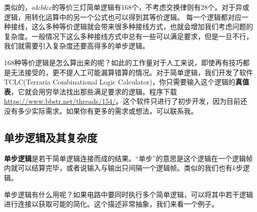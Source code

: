 类似的，$a\&b\&c$的等价三灯简单逻辑有168个，不考虑交换律则有28个。对于异或逻辑，用转化运算中的另一个公式也可以得到其等价逻辑。
每一个逻辑都对应一种接线，这么多种等价逻辑就会带来很多种接线方式，也就会增加我们考虑问题的复杂度。一般情况下这么多种接线方式中总有一些可以满足要求，但是一旦不行，我们就需要引入复杂度还要高得多的单步逻辑。

168种等价逻辑是怎么算出来的呢？如此的工作量对于人工来说，即使再有技巧都是无法接受的，更不提人工可能漏算错算的情况。对于简单逻辑，我们开发了软件TCLC(Terraria Combinational Logic Calculator)，你只需要输入这个逻辑的\textbf{真值表}，它就会用穷举法找出那些满足要求的逻辑。程序下载\url{https://www.bbstr.net/threads/154/}。这个软件只进行了初步开发，因为目前还没有多少实际需求。如果你有更多的需求或想法，可以联系我。

\subsection{单步逻辑及其复杂度}
\textbf{单步逻辑}是若干简单逻辑连接而成的结果。“单步”的意思是这个逻辑在一个逻辑帧内就可以结算完毕，或者说输入与输出只间隔一个逻辑帧。类似的我们也有$k$步逻辑。

单步逻辑有什么用呢？如果电路中要同时执行多个简单逻辑，可以将其中若干逻辑进行连接以获取可能的简化。这个描述非常抽象，我们来看一个例子。

